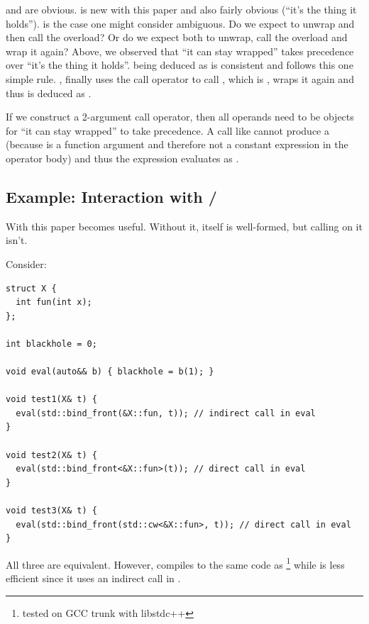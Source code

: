  and  are obvious.
 is new with this paper and also fairly obvious (“it's the thing it holds”).
 is the case one might consider ambiguous.
Do we expect  to unwrap and then call the  overload?
Or do we expect both to unwrap, call the  overload and wrap it again?
Above, we observed that “it can stay wrapped” takes precedence over “it's the thing it holds”.
 being deduced as  is consistent and follows this one simple rule.
, finally uses the  call operator to call ,
which is , wraps it again and thus is deduced as .

If we construct a 2-argument call operator, then all operands need to be 
objects for “it can stay wrapped” to take precedence.
A call like  cannot produce a  (because
 is a function argument and therefore not a constant expression in the operator body) and
thus the expression evaluates as .

\subsection{Example: Interaction with  / }

With this paper \std{} becomes useful.
Without it, \std{} itself is well-formed, but calling
 on it isn't.

Consider:\medskip
\begin{lstlisting}
struct X {
  int fun(int x);
};

int blackhole = 0;

void eval(auto&& b) { blackhole = b(1); }

void test1(X& t) {
  eval(std::bind_front(&X::fun, t)); // indirect call in eval
}

void test2(X& t) {
  eval(std::bind_front<&X::fun>(t)); // direct call in eval
}

void test3(X& t) {
  eval(std::bind_front(std::cw<&X::fun>, t)); // direct call in eval
}
\end{lstlisting}

All three are equivalent.
However,  compiles to the same code as \footnote{tested on GCC trunk with
libstdc++} while  is less efficient since it uses an indirect call in .

